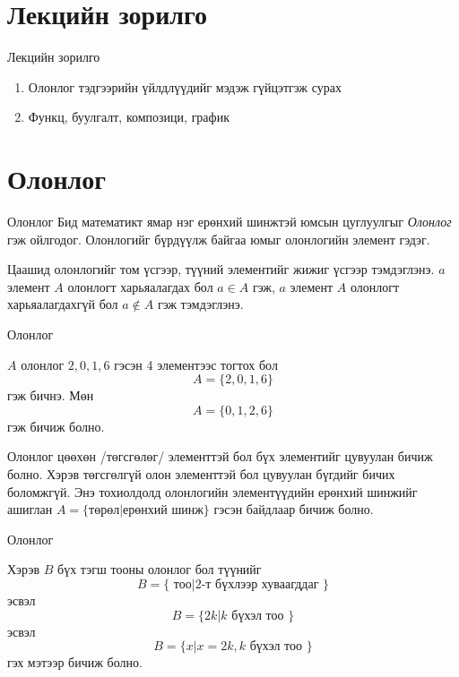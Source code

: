 

\section*{Лекцийн зорилго}
\begin{frame}[allowframebreaks]{Лекцийн зорилго}
\begin{enumerate}
    \item Олонлог тэдгээрийн үйлдлүүдийг мэдэж гүйцэтгэж сурах
    \item Функц, буулгалт, композици, график 
\end{enumerate}
\end{frame}

\section{Олонлог}
\begin{frame}[allowframebreaks]{Олонлог}
Бид математикт ямар нэг ерөнхий шинжтэй юмсын цуглуулгыг {\it Олонлог} гэж ойлгодог.
Олонлогийг бүрдүүлж байгаа юмыг олонлогийн элемент гэдэг. 


Цаашид олонлогийг том үсгээр, түүний элементийг жижиг үсгээр тэмдэглэнэ. $a$ элемент $A$ олонлогт харьяалагдах бол $a\in A$ гэж, $a$ элемент $A$ олонлогт харьяалагдахгүй бол $a\notin A$ гэж тэмдэглэнэ. 
\end{frame}

\begin{frame}[allowframebreaks]{Олонлог}
\begin{example}\label{ol:A} $A$ олонлог $2, 0, 1, 6$ гэсэн 4 элементээс тогтох бол $$A=\{2, 0, 1, 6\}$$ гэж бичнэ. Мөн $$A=\{0, 1, 2, 6\}$$ гэж бичиж болно.
\end{example}
Олонлог цөөхөн /төгсгөлөг/ элементтэй бол бүх элементийг цувуулан бичиж болно. Хэрэв төгсгөлгүй олон элементтэй бол цувуулан бүгдийг бичих боломжгүй. Энэ тохиолдолд олонлогийн элементүүдийн ерөнхий шинжийг ашиглан $A=\{{\text {төрөл}}| {\text{ерөнхий шинж}}\}$ гэсэн байдлаар бичиж болно. 
\end{frame}

\begin{frame}[allowframebreaks]{Олонлог}
\begin{example}\label{ol:B}
Хэрэв $B$ бүх тэгш тооны олонлог бол түүнийг $$B=\{ {\text { тоо}}| {\text{2-т бүхлээр хуваагддаг }}\}$$ эсвэл $$B=\{2k| k{\text{ бүхэл тоо }}\}$$ эсвэл $$B=\{ x | x=2k, k{\text{ бүхэл тоо }}\}$$ гэх мэтээр бичиж болно. 
\end{example}
\end{frame}

